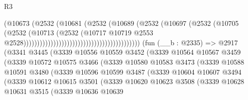 \begin{lexlean}{R3}
\begin{coremodule}
                                                                (@10673
                                                                  (@2532
                                                                    (@10681
                                                                      (@2532
                                                                        (@10689
                                                                          (@2532
                                                                            (@10697
                                                                              (@2532
                                                                                (@10705
                                                                                  (@2532
                                                                                    (@10713
                                                                                      (@2532
                                                                                        (@10717
                                                                                          @10719
                                                                                          @2553
                                                                                          @2528)))))))))))))))))))))))))))))))))))))))))))
    (fun (__b : @2335) =>
    @2917
      (@3341
        @3445
        (@3339
          @10556
          @10559
          @3452
          (@3339
            @10564
            @10567
            @3459
            (@3339
              @10572
              @10575
              @3466
              (@3339
                @10580
                @10583
                @3473
                (@3339
                  @10588
                  @10591
                  @3480
                  (@3339
                    @10596
                    @10599
                    @3487
                    (@3339
                      @10604
                      @10607
                      @3494
                      (@3339
                        @10612
                        @10615
                        @3501
                        (@3339
                          @10620
                          @10623
                          @3508
                          (@3339
                            @10628
                            @10631
                            @3515
                            (@3339
                              @10636
                              @10639

\end{coremodule}
\end{lexlean}
